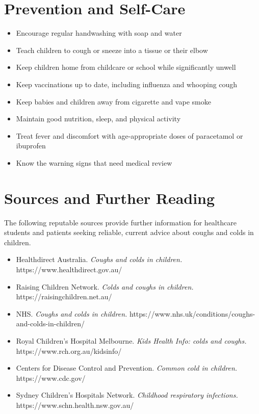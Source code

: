 \section*{Prevention and Self-Care}
\begin{itemize}
    \item Encourage regular handwashing with soap and water
    \item Teach children to cough or sneeze into a tissue or their elbow
    \item Keep children home from childcare or school while significantly unwell
    \item Keep vaccinations up to date, including influenza and whooping cough
    \item Keep babies and children away from cigarette and vape smoke
    \item Maintain good nutrition, sleep, and physical activity
    \item Treat fever and discomfort with age-appropriate doses of paracetamol or ibuprofen
    \item Know the warning signs that need medical review
\end{itemize}

\section*{Sources and Further Reading}
The following reputable sources provide further information for healthcare students and patients seeking reliable, current advice about coughs and colds in children.

\begin{itemize}
    \item Healthdirect Australia. \textit{Coughs and colds in children.} https://www.healthdirect.gov.au/
    \item Raising Children Network. \textit{Colds and coughs in children.} https://raisingchildren.net.au/
    \item NHS. \textit{Coughs and colds in children.} https://www.nhs.uk/conditions/coughs-and-colds-in-children/
    \item Royal Children's Hospital Melbourne. \textit{Kids Health Info: colds and coughs.} https://www.rch.org.au/kidsinfo/
    \item Centers for Disease Control and Prevention. \textit{Common cold in children.} https://www.cdc.gov/
    \item Sydney Children's Hospitals Network. \textit{Childhood respiratory infections.} https://www.schn.health.nsw.gov.au/
\end{itemize}
